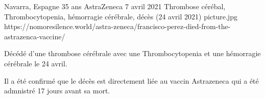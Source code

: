 {Navarra, Espagne}
{35 ans}
{AstraZeneca}
{7 avril 2021}
{Thrombose cérébal, Thrombocytopenia, hémorragie cérébrale, décès (24 avril 2021)}
{picture.jpg}
{https://nomoresilence.world/astra-zeneca/francisco-perez-died-from-the-astrazenca-vaccine/}
{

Décédé d'une thrombose cérébrale avec une Thrombocytopenia et une hémorragie
cérébrale le 24 avril.

Il a été confirmé que le décès est directement liée au vaccin Astrazeneca qui a
été admnistré 17 jours avant sa mort.

}
